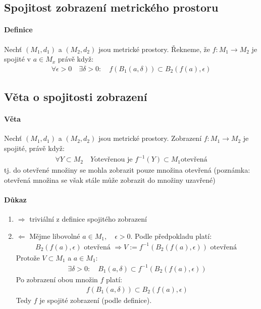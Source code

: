 \documentclass[a4paper,10pt]{article}
\begin{document}
\subsection{Spojitost zobrazení metrického prostoru}
\setcounter{equation}{0}
\paragraph{Definice}
Nechť $(M_1, d_1)$ a $(M_2, d_2)$ jsou metrické prostory. Řekneme, že $f: M_1 \to M_2$ je
spojité v $a \in M_x$ právě když:
\begin{align*}
	\forall \epsilon > 0 \quad \exists \delta > 0: \quad f(B_1(a, \delta))
	\subset B_2(f(a), \epsilon)
\end{align*}


\subsection{Věta o spojitosti zobrazení}
\setcounter{equation}{0}
\paragraph{Věta}
Nechť $(M_1, d_1)$ a $(M_2, d_2)$ jsou metrické prostory. Zobrazení $f: M_1 \to
M_2$ je spojité, právě když:
\begin{align*}
	\forall Y \subset M_2 \quad Y \text{otevřenou je } f^{-1}(Y) \subset M_1
	\text{otevřená}
\end{align*}
tj. do otevřené množiny se mohla zobrazit pouze množina otevřená (poznámka:
otevřená množina se však stále může zobrazit do množiny uzavřené)
\paragraph{Důkaz}
\begin{enumerate}
	\item $\Rightarrow$
		triviální z definice spojitého zobrazení
	\item $\Leftarrow$
		Mějme libovolné $a \in M_1, \quad \epsilon > 0$. Podle předpokladu
		platí:
		\begin{align}
			B_2(f(a), \epsilon) \text{ otevřená } \Rightarrow V := f^{-1}(B_2(f(a),
			\epsilon)) \text{ otevřená }
		\end{align}
		Protože $V \subset M_1$ a $a \in M_1$:
		\begin{align}
			\exists \delta > 0: \quad B_1(a, \delta) \subset f^{-1}(B_2(f(a),
			\epsilon))
		\end{align}
		Po zobrazení obou množin $f$ platí:
		\begin{align}
			f(B_1(a, \delta)) \subset B_2(f(a), \epsilon)
		\end{align}
		Tedy $f$ je spojité zobrazení (podle definice).
\end{enumerate}
\end{document}
